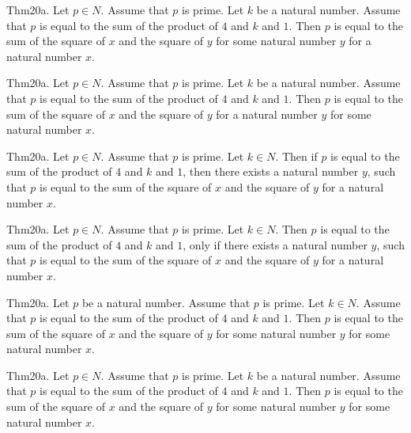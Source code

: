 \documentclass{article}
\begin{document}
Thm20a. Let $p \in N$. Assume that $p$ is prime. Let $k$ be a natural number. Assume that $p$ is equal to the sum of the product of $4$ and $k$ and $1$. Then $p$ is equal to the sum of the square of $x$ and the square of $y$ for some natural number $y$ for a natural number $x$.

Thm20a. Let $p \in N$. Assume that $p$ is prime. Let $k$ be a natural number. Assume that $p$ is equal to the sum of the product of $4$ and $k$ and $1$. Then $p$ is equal to the sum of the square of $x$ and the square of $y$ for a natural number $y$ for some natural number $x$.

Thm20a. Let $p \in N$. Assume that $p$ is prime. Let $k \in N$. Then if $p$ is equal to the sum of the product of $4$ and $k$ and $1$, then there exists a natural number $y$, such that $p$ is equal to the sum of the square of $x$ and the square of $y$ for a natural number $x$.

Thm20a. Let $p \in N$. Assume that $p$ is prime. Let $k \in N$. Then $p$ is equal to the sum of the product of $4$ and $k$ and $1$, only if there exists a natural number $y$, such that $p$ is equal to the sum of the square of $x$ and the square of $y$ for a natural number $x$.

Thm20a. Let $p$ be a natural number. Assume that $p$ is prime. Let $k \in N$. Assume that $p$ is equal to the sum of the product of $4$ and $k$ and $1$. Then $p$ is equal to the sum of the square of $x$ and the square of $y$ for some natural number $y$ for some natural number $x$.

Thm20a. Let $p \in N$. Assume that $p$ is prime. Let $k$ be a natural number. Assume that $p$ is equal to the sum of the product of $4$ and $k$ and $1$. Then $p$ is equal to the sum of the square of $x$ and the square of $y$ for some natural number $y$ for some natural number $x$.
\end{document}
